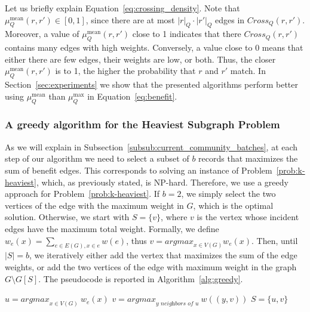 \documentclass[sigconf, nonacm]{acmart}
\newcommand{\window}{b}
\newcommand{\argmax}{\textit{argmax}}
\begin{document}
Let us briefly explain Equation~\ref{eq:crossing_density}. Note that $\mu_Q^{\text{mean}}(r,r')\in[0,1]$, since there are at most $|r|_Q\cdot|r'|_Q$ edges in $\textit{Cross}_Q(r,r')$. Moreover,  a value of  $\mu_Q^{\text{mean}}(r,r')$ close to 1 indicates that there $\textit{Cross}_Q(r,r')$ contains many edges with high weights. Conversely, a value close to 0 means that either there are few edges, their weights are low, or both. Thus, the closer $\mu_Q^{\text{mean}}(r,r')$ is to 1, the higher the probability that $r$ and $r'$ match. In Section~\ref{sec:experiments} we show that the presented algorithms perform better using $\mu_Q^{\text{mean}}$ than $\mu_Q^{\text{max}}$ in Equation~\ref{eq:benefit}.



\subsubsection{A greedy algorithm for the Heaviest Subgraph Problem}\label{subsub:greedy}


As we will explain in Subsection~\ref{subsub:current_community_batches}, at each step of our algorithm we need to select a subset of $\window$ records that maximizes the sum of benefit edges. This corresponds to solving an instance of Problem~\ref{prob:k-heaviest}, which, as previously stated, is NP-hard. Therefore, we use a greedy approach for Problem~\ref{prob:k-heaviest}. 
If $b=2$, we simply select the two vertices of the edge with the maximum weight in $G$, which is the optimal solution. Otherwise, we start with $S=\{v\}$, where $v$ is the vertex whose incident edges have the maximum total weight. Formally, we define $w_e(x) =\sum_{e\in E(G), x\in e}w(e)$, thus $v = \argmax_{x\in V(G)} w_e(x)$. 
Then, until $|S| = b$, we iteratively either add the vertex that maximizes the sum of the edge weights, or add the two vertices of the edge with maximum weight in the graph $G\setminus G[S]$. The pseudocode is reported in Algorithm~\ref{alg:greedy}.


\begin{algorithm}[h]
\caption{\textit{GreedyHS}$(G, b)$}\label{alg:greedy}
{
$u = \argmax_{x\in V(G)}\ w_e(x)$\;  
$v = \argmax_{y \textit{ neighbors of } u}\ w((y,v))$\;
$S = \{u,v\}$\;
}
\end{algorithm}
\end{document}
